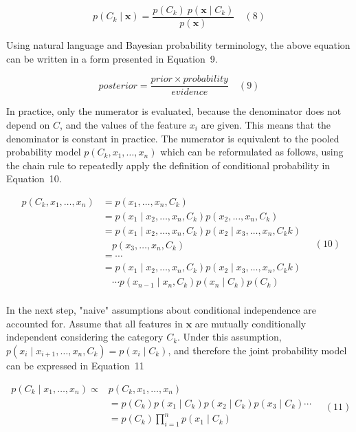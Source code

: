 \documentclass[preprint,12pt]{elsarticle}
\begin{document}
\begin{equation}
	p(C_{k}\mid \mathbf{x})={\frac{p(C_{k})\ p(\mathbf{x} \mid C_{k})}{p(\mathbf{x})}}
	\quad\left(8\right)
\end{equation}

Using natural language and Bayesian probability terminology, the above equation can be written in a form presented in Equation~9.

\begin{equation}
	posterior = \frac{prior \times probability}{evidence}
	\quad\left(9\right)
\end{equation}

In practice, only the numerator is evaluated, because the denominator does not depend on $C$, and the values of the feature $x_{i}$ are given. This means that the denominator is constant in practice. The numerator is equivalent to the pooled probability model $p(C_{k},x_{1},\ldots,x_{n})$ which can be reformulated as follows, using the chain rule to repeatedly apply the definition of conditional probability in Equation~10.

\begin{equation}
	\begin{aligned}
        p(C_{k},x_{1},\ldots,x_{n}) &= p(x_{1},\ldots,x_{n},C_{k}) \\
        &= p(x_{1}\mid x_{2}, \ldots,x_{n},C_{k}) p(x_{2},\ldots,x_{n},C_{k}) \\
        &= p(x_{1}\mid x_{2}, \ldots,x_{n},C_{k}) p(x_{2}\mid x_{3}, \ldots,x_{n},C_{k} {k}) \\
        &\quad p(x_{3},\ldots,x_{n},C_{k}) \\
        &= \cdots \\
        &= p(x_{1}\mid x_{2}, \ldots,x_{n},C_{k}) p(x_{2}\mid x_{3}, \ldots,x_{n},C_{k} {k}) \\
        &\quad \cdots p(x_{n-1}\mid x_{n},C_{k}) p(x_{n}\mid C_{k}) p(C_{k})\\
    \end{aligned}
	\quad\left(10\right)
\end{equation}

In the next step, "naive" assumptions about conditional independence are accounted for. Assume that all features in $\mathbf{x}$ are mutually conditionally independent considering the category $C_{k}$. Under this assumption, $p(x_{i}\mid x_{i+1}, \ldots,x_{n},C_{k}) = p(x_{i}\mid C_{k})$, and therefore the joint probability model can be expressed in Equation~11

\begin{equation}
	\begin{aligned}
        p(C_{k}\mid x_{1},\ldots,x_{n}) \propto &p(C_{k}, x_{1},\ldots,x_{n}) \\
        &= p(C_{k})p(x_{1}\mid C_{k}) p(x_{2}\mid C_{k}) p(x_{3}\mid C_{k}) \cdots \\
        &= p(C_{k}) \prod_{i=1}^{n} p(x_{1}\mid C_{k}) \\
    \end{aligned}
	\quad\left(11\right)
\end{equation}
\end{document}
